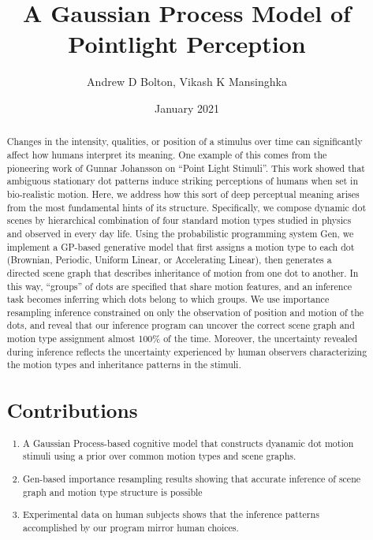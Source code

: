 \documentclass[12pt, letterpaper]{article}
\title{A Gaussian Process Model of Pointlight Perception}
\author{Andrew D Bolton, Vikash K Mansinghka}
\date{January 2021}
\begin{document}
\maketitle

\begin{abstract}
Changes in the intensity, qualities, or position of a stimulus over time can significantly affect how humans interpret its meaning. One example of this comes from the pioneering work of Gunnar Johansson on ``Point Light Stimuli''. This work showed that ambiguous stationary dot patterns induce striking perceptions of humans when set in bio-realistic motion. Here, we address how this sort of deep perceptual meaning arises from the most fundamental hints of its structure. Specifically, we compose dynamic dot scenes by hierarchical combination of four standard motion types studied in physics and observed in every day life. Using the probabilistic programming system Gen, we implement a GP-based generative model that first assigns a motion type to each dot (Brownian, Periodic, Uniform Linear, or Accelerating Linear), then generates a directed scene graph that describes inheritance of motion from one dot to another. In this way, ``groups'' of dots are specified that share motion features, and an inference task becomes inferring which dots belong to which groups. We use importance resampling inference constrained on only the observation of position and motion of the dots, and reveal that our inference program can uncover the correct scene graph and motion type assignment almost 100\% of the time. Moreover, the uncertainty revealed during inference reflects the uncertainty experienced by human observers characterizing the motion types and inheritance patterns in the stimuli. 


\section*{Contributions}

\begin{enumerate}
  \item A Gaussian Process-based cognitive model that constructs dyanamic dot motion stimuli using a prior over common motion types and scene graphs.
  \item Gen-based importance resampling results showing that accurate inference of scene graph and motion type structure is possible
  \item Experimental data on human subjects shows that the inference patterns accomplished by our program mirror human choices. 
\end{enumerate}    


\end{abstract}
\end{document}
